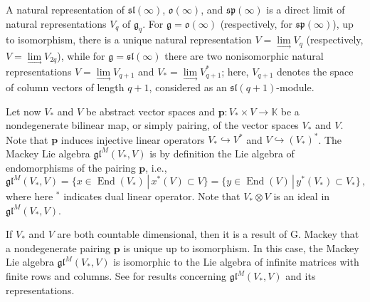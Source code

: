 \documentclass[11pt]{article}
\theoremstyle{plain}
\theoremstyle{nonumberplain}
\theoremstyle{plain}
\theoremstyle{nonumberplain}
\newcommand\bK{\mathbb K}
\newcommand\bT{\mathbb T}
\newcommand\fg{\mathfrak{g}}
\newcommand\fgl{\mathfrak{gl}}
\newcommand\fsl{\mathfrak{sl}}
\newcommand\fo{\mathfrak{o}}
\newcommand\fsp{\mathfrak{sp}}
\DeclareMathOperator{\End}{\mathrm{End}}
\begin{document}
	A natural representation of $\fsl(\infty)$, $\fo(\infty)$, and
        $\fsp(\infty)$ is a direct limit of natural representations
        $V_q$ of $\fg_q$.  For $\fg=\fo(\infty)$ (respectively, for
        $\fsp(\infty)$), up to isomorphism, there is a unique natural
        representation $V=\lim\limits_{\longrightarrow} V_q$
        (respectively, $V=\lim\limits_{\longrightarrow} V_{2q}$),
        while for $\fg=\fsl(\infty)$ there are two nonisomorphic
        natural representations
        $V=\lim\limits_{\longrightarrow} V_{q+1}$ and
        $V_*=\lim\limits_{\longrightarrow} V_{q+1}^*$; here, $V_{q+1}$
        denotes the space of column vectors of length $q+1$,
        considered as an $\mathfrak{sl}(q+1)$-module.
%	
	
	Let now $V_*$ and $V$ be abstract vector spaces and $\mathbf{p}:V_*\times V\to\bK$
        be a nondegenerate bilinear map, or simply pairing, of the
        vector spaces $V_*$ and $V$.  Note that $\mathbf{p}$ induces injective
        linear operators $V_*\hookrightarrow V^*$ and
        $V\hookrightarrow \left(V_*\right)^*$.  The Mackey Lie algebra $\fgl^M(V_*,V)$
        is by definition the Lie algebra of endomorphisms of the
        pairing $\mathbf{p}$, i.e.,
	\begin{equation}
	\fgl^M(V_*,V)=\big\{x\in\End\left( V_*\right)\,|\,x^*(V)\subset V\big\} = \big\{ y\in \End(V)\,|\,y^*(V_*)\subset V_*\big\}\,,
		\label{eq.fglM}
	\end{equation}
	where here $^*$ indicates dual linear operator.  Note that $V_*\otimes V$ is an ideal in $\fgl^M\left(V_*,V\right)$.

	If $V_*$ and $V$ are both countable dimensional, then it is a
        result of G. Mackey \cite{M} that a nondegenerate pairing
        $\mathbf{p}$ is unique up to isomorphism.  In this case, the
        Mackey Lie algebra $\fgl^M(V_*,V)$ is isomorphic to the Lie
        algebra of infinite matrices with finite rows and columns.
        See \cite{PS2} for results concerning $\fgl^M(V_*,V)$ and its
        representations.
	
\end{document}
